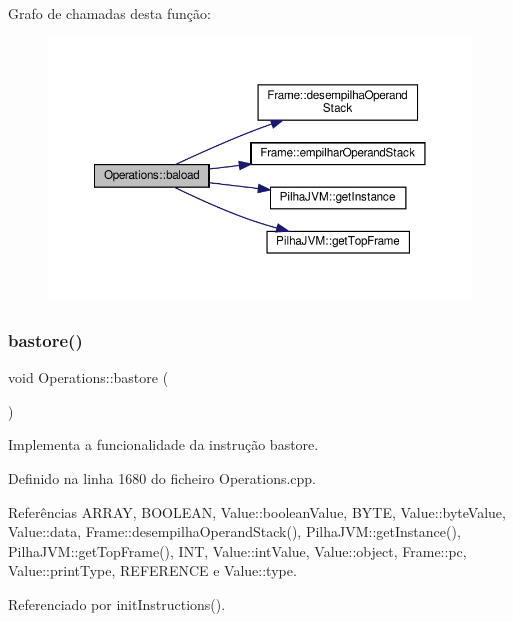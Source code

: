 Grafo de chamadas desta função\+:\nopagebreak
\begin{figure}[H]
\begin{center}
\leavevmode
\includegraphics[width=350pt]{classOperations_afdf1759637e332569a2b2b17067e05f0_cgraph}
\end{center}
\end{figure}
\mbox{\label{classOperations_a6f0ded6d2fc9921a1418387527bec8f4}} 
\subsubsection{\texorpdfstring{bastore()}{bastore()}}
{\footnotesize\ttfamily void Operations\+::bastore (\begin{DoxyParamCaption}{ }\end{DoxyParamCaption})\hspace{0.3cm}{\ttfamily [private]}}



Implementa a funcionalidade da instrução bastore. 



Definido na linha 1680 do ficheiro Operations.\+cpp.



Referências A\+R\+R\+AY, B\+O\+O\+L\+E\+AN, Value\+::boolean\+Value, B\+Y\+TE, Value\+::byte\+Value, Value\+::data, Frame\+::desempilha\+Operand\+Stack(), Pilha\+J\+V\+M\+::get\+Instance(), Pilha\+J\+V\+M\+::get\+Top\+Frame(), I\+NT, Value\+::int\+Value, Value\+::object, Frame\+::pc, Value\+::print\+Type, R\+E\+F\+E\+R\+E\+N\+CE e Value\+::type.



Referenciado por init\+Instructions().

